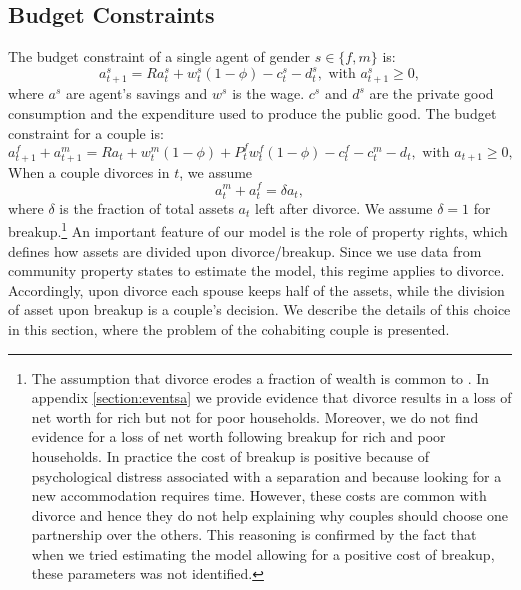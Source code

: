 \documentclass[12pt]{article}
\numberwithin{table}{section}
\begin{document}
\subsection{Budget Constraints}
The budget constraint of a single agent of gender  $s\in\{f,m\}$ is:
\begin{equation}\label{eq:bcs}
a^s_{t+1}=R a^s_t+w^s_t(1-\phi)-c^s_t-d^s_t, \text{ with }a^s_{t+1}\geq0,
\end{equation}
where $a^s$ are agent's savings and $w^s$ is the wage. $c^s$ and $d^s$ are the private good consumption and the expenditure used to produce the public good.
The budget constraint for a couple is:
\begin{equation}\label{eq:bcm}
a^f_{t+1}+a^m_{t+1}=R a_t+w^m_t(1-\phi)+P^f_t w^f_t(1-\phi)-c^f_t-c^m_t-d_t, \text{ with }a_{t+1}\geq0,
\end{equation}
When a couple divorces in $t$, we assume 
\[a^m_t+a^f_t=\delta a_t,\]
where $\delta$ is the fraction of total assets $a_t$ left after divorce. We assume $\delta=1$ for breakup.\footnote{The assumption that divorce erodes a fraction of wealth is common to \cite{cubeddu2003}. In appendix \ref{section:eventsa} we provide evidence that divorce results in a loss of net worth for rich but not for poor households. Moreover, we do not find evidence for a loss of net worth following breakup for rich and poor households. In practice the cost of breakup is positive because of psychological distress associated with a separation and because looking for a new accommodation requires time. However, these costs are common with divorce and hence they do not help explaining why couples should choose one partnership over the others. This reasoning is confirmed by the fact that when we tried estimating the model allowing for a positive cost of breakup, these parameters was not identified.} 
An important feature of our model is the role of property rights, which defines how assets are divided upon divorce/breakup. Since we use data from community property states to estimate the model, this regime applies to divorce. Accordingly, upon divorce each spouse keeps half of the assets, while the division of asset upon breakup is a couple's decision. We describe the details of this choice in this section, where the problem of the cohabiting couple is presented.
\end{document}
